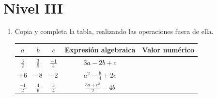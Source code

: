 \documentclass[10pt,twoside]{article}
\begin{document}
\section*{Nivel III}
\begin{enumerate}
 \item Copia y completa la tabla, realizando las operaciones fuera de ella.
 \begin{center}
\begin{tabular}{|c|c|c|c|c|}\hline
$a$ & $b$ & $c$ & Expresión algebraica & Valor numérico \\ \hline
$\frac{3}{2}$ & $\frac{3}{5}$ & $\frac{-1}{4}$ & $3a-2b+c$ & \\ \hline
$+6$ & $-8$ & $-2$ & $a^{2}-\frac{b}{4}+2c$ & \\ \hline
$\frac{-1}{2}$ & $\frac{4}{6}$ & $\frac{3}{4}$ & $\frac{3a+c^{2}}{2}-4b$ &  \\ \hline
 \end{tabular}
 \end{center}

\end{enumerate}
\end{document}
